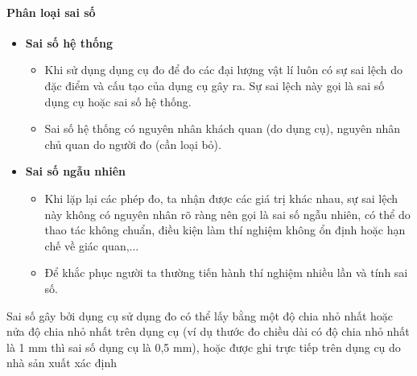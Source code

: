 \paragraph{Phân loại sai số}
\begin{itemize}
\item[a)] \textbf{Sai số hệ thống}
\begin{itemize}
\item Khi sử dụng dụng cụ đo để đo các đại lượng vật lí luôn có sự sai lệch do đặc điểm và cấu tạo của dụng cụ gây ra. Sự sai lệch này gọi là sai số dụng cụ hoặc sai số hệ thống.
\item Sai số hệ thống có nguyên nhân khách quan (do dụng cụ), nguyên nhân chủ quan do người đo (cần loại bỏ).
\end{itemize}	
\item[b)] \textbf{Sai số ngẫu nhiên}
\begin{itemize}
\item Khi lặp lại các phép đo, ta nhận được các giá trị khác nhau, sự sai lệch này không có nguyên nhân rõ ràng nên gọi là sai số ngẫu nhiên, có thể do thao tác không chuẩn, điều kiện làm thí nghiệm không ổn định hoặc hạn chế về giác quan,...
\item Để khắc phục người ta thường tiến hành thí nghiệm nhiều lần và tính sai số.
\end{itemize}	
\end{itemize}
\begin{note}
Sai số gây bởi dụng cụ sử dụng đo có thể lấy bằng một độ chia nhỏ nhất hoặc nửa độ chia nhỏ nhất trên dụng cụ (ví dụ thước đo chiều dài có độ chia nhỏ nhất là 1 mm thì sai số dụng cụ là 0,5 mm), hoặc được ghi trực tiếp trên dụng cụ do nhà sản xuất xác định
\end{note}

